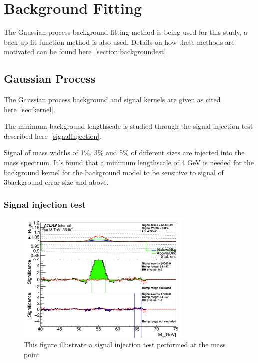 \section{Background Fitting}

The Gaussian process background fitting method is being used for this study, a back-up fit function method is also used. Details on how these methods are motivated can be found here~\ref{section:backgroundest}.  

\subsection{Gaussian Process}

The Gaussian process background and signal kernels are given as cited here~\ref{sec:kernel}.

The minimum background lengthscale is studied through the signal injection test described here~\ref{signalInjection}.

Signal of mass widths of 1\%, 3\% and 5\% of different sizes are injected into the mass spectrum. It's found that a minimum lengthscale of 4 GeV is needed for the background kernel for the background model to be sensitive to signal of 3\sigma background error size and above.


\subsubsection{Signal injection test}
\begin{figure}[!htb]
    \begin{center}
        \includegraphics[width=0.75\textwidth]{figures/chapter_dimuon/signalInjection}        
        \caption{
        This figure illustrate a signal injection test performed at the mass point  }
            \label{fig:dimuonstudies}
    \end{center}
\end{figure}

